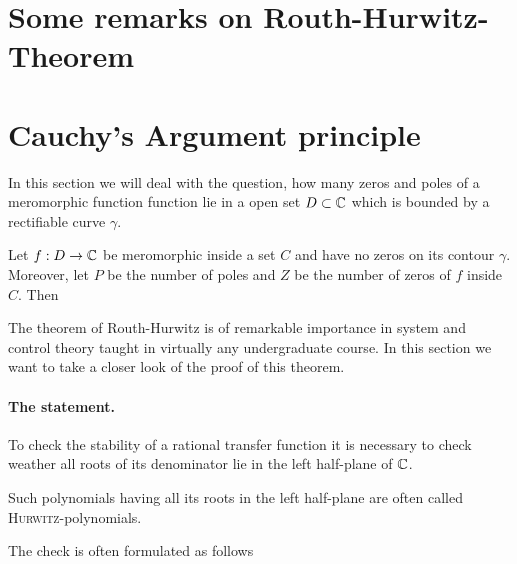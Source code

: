 \documentclass[10pt,a4paper]{article}
\begin{document}
\section{Some remarks on Routh-Hurwitz-Theorem}






\section{Cauchy's Argument principle}

In this section we will deal with the question, how many zeros and poles of a meromorphic function function lie in a open set $D \subset \mathbb{C}$ which is bounded by a rectifiable curve $\gamma$.

\begin{lemma} 
Let $f:D\rightarrow\mathbb{C}$ be meromorphic inside a set $C$ and have no zeros on its contour $\gamma$. Moreover, let $P$ be the number of poles and $Z$ be the number of zeros of $f$ inside $C$. Then
\end{lemma}

The theorem of Routh-Hurwitz is of remarkable importance in system and control theory taught in virtually any undergraduate course. In this section we want to take a closer look of the proof of this theorem.

\paragraph{The statement.}

To check the stability of a rational transfer function it is necessary to check weather all roots of its denominator lie in the left half-plane of $\mathbb{C}$.

Such polynomials having all its roots in the left half-plane are often called \textsc{Hurwitz}-polynomials.

The check is often formulated as follows
\end{document}

